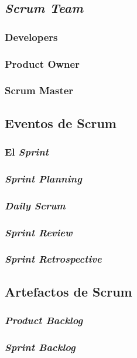 \begin{spacing}{1.5}
	\subsection{\textit{Scrum Team}}
				\lipsum[1]
		\subsubsection{Developers}
					\lipsum[1]
		\subsubsection{Product Owner}
					\lipsum[1]
		\subsubsection{Scrum Master}
					\lipsum[1]
	\subsection{Eventos de Scrum}
				\lipsum[1]
		\subsubsection{El \textit{Sprint}}
					\lipsum[1]
		\subsubsection{\textit{Sprint Planning}}
					\lipsum[1]
		\subsubsection{\textit{Daily Scrum}}
					\lipsum[1]
		\subsubsection{\textit{Sprint Review}}
					\lipsum[1]
		\subsubsection{\textit{Sprint Retrospective}}
					\lipsum[1]
	\subsection{Artefactos de Scrum}
				\lipsum[1]
		\subsubsection{\textit{Product Backlog}}
					\lipsum[1]
		\subsubsection{\textit{Sprint Backlog}}
					\lipsum[1]

\end{spacing}
